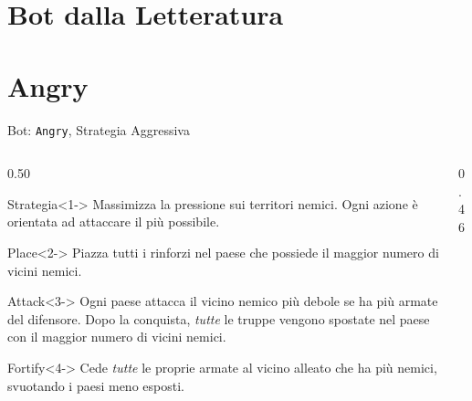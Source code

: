 \documentclass[9pt,serif,usenames,dvipsnames]{beamer}
\begin{document}
	\section{Bot dalla Letteratura}

	\section{Angry}
	\begin{frame}{\centering Bot: \texttt{Angry}, Strategia Aggressiva}
		\begin{columns}[T]
			\begin{column}{0.50\textwidth}
				\begin{block}{Strategia}<1->
					\small
					Massimizza la \alert{pressione sui territori nemici}.
					Ogni azione è orientata ad attaccare il più possibile.
				\end{block}
				\begin{block}{Place}<2->
					\small
					Piazza \alert{tutti} i rinforzi nel paese che possiede il
					maggior numero di vicini nemici.
				\end{block}
				\begin{block}{Attack}<3->
					\small
					Ogni paese attacca il vicino nemico \alert{più debole} se ha
					più armate del difensore. Dopo la conquista, \emph{tutte} le
					truppe vengono spostate nel paese con il maggior numero di
					vicini nemici.
				\end{block}
				\begin{block}{Fortify}<4->
					\small
					Cede \emph{tutte} le proprie armate al vicino alleato che ha
					\alert{più nemici}, svuotando i paesi meno esposti.
				\end{block}
			\end{column}
			\begin{column}{0.46\textwidth}
				\begin{center}
\end{center}
\end{column}
\end{columns}
\end{frame}
\end{document}
